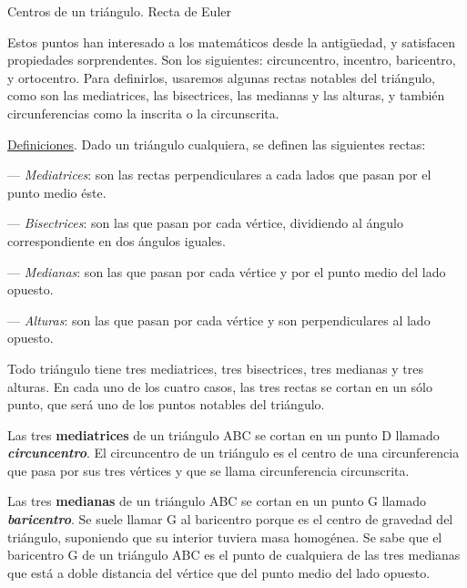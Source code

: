 \vspace{5mm}
\begin{myalertblock}{Centros de un triángulo. Recta de Euler}
	
	Estos puntos han interesado a los matemáticos desde la antigüedad, y satisfacen propiedades sorprendentes. Son los siguientes: circuncentro, incentro, baricentro, y ortocentro. Para definirlos, usaremos algunas rectas notables del triángulo, como son las mediatrices, las bisectrices, las medianas y las alturas, y también circunferencias como la inscrita o la circunscrita.
	
\vspace{2mm} \underline{Definiciones}. Dado un triángulo cualquiera, se definen las siguientes rectas:

\vspace{1mm} --- \emph{Mediatrices}: son las rectas perpendiculares a cada lados que pasan por el punto medio éste.

\vspace{1mm} --- \emph{Bisectrices}: son las que pasan por cada vértice, dividiendo al ángulo correspondiente en dos ángulos iguales.

\vspace{1mm} --- \emph{Medianas}: son las que pasan por cada vértice y por el punto medio del lado opuesto. 

\vspace{1mm} --- \emph{Alturas}: son las que pasan por cada vértice y son perpendiculares al lado opuesto.

\vspace{2mm} Todo triángulo tiene tres mediatrices, tres bisectrices, tres medianas y tres alturas. En cada uno de los cuatro casos, las tres rectas se cortan en un sólo punto, que será uno de los puntos notables del triángulo.

\vspace{2mm} Las tres \textbf{mediatrices} de un triángulo ABC se cortan en un punto D llamado \textbf{\emph{circuncentro}}. El circuncentro  de un triángulo es el centro de una circunferencia que pasa por sus tres vértices  y que se llama circunferencia circunscrita.

\vspace{2mm} Las tres \textbf{medianas} de un triángulo ABC se cortan en un punto G llamado \textbf{\emph{baricentro}}. Se suele llamar G al baricentro porque es el centro de gravedad del triángulo, suponiendo que su interior tuviera masa homogénea. Se sabe que el baricentro G de un triángulo ABC es el punto de cualquiera de las tres medianas que está a doble distancia del vértice que del punto medio del lado opuesto.


\end{myalertblock}
